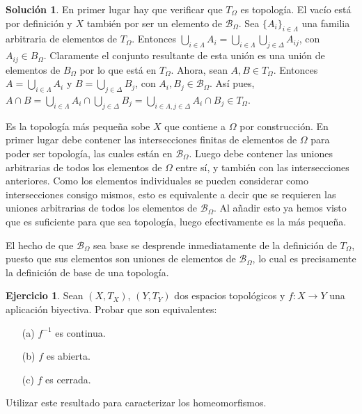 \documentclass{article}
\theoremstyle{plain}
\theoremstyle{definition}
\newtheorem{exercise}{Ejercicio}
\newtheorem*{sol*}{Solución}
\begin{document}
\begin{sol*}
En primer lugar hay que verificar que $T_\Omega$ es topología. El vacío está por definición y $X$ también por ser un elemento de $\mathcal{B}_\Omega$. Sea $\{A_i\}_{i\in\Lambda}$ una familia arbitraria de elementos de $T_\Omega$. Entonces $\bigcup_{i\in\Lambda}A_i=\bigcup_{i\in\Lambda}\bigcup_{j\in\Delta} A_{ij}$, con $A_{ij}\in B_\Omega$. Claramente el conjunto resultante de esta unión es una unión de elementos de $B_\Omega$ por lo que está en $T_\Omega$. Ahora, sean $A,B\in T_\Omega$. Entonces $A=\bigcup_{i\in\Lambda} A_i$ y $B=\bigcup_{j\in\Delta} B_j$, con $A_i,B_j\in\mathcal{B}_\Omega$. Así pues, $A\cap B=\bigcup_{i\in\Lambda} A_i\cap \bigcup_{j\in\Delta} B_j = \bigcup_{i\in\Lambda,j\in\Delta} A_i \cap B_j\in T_\Omega$.

Es la topología más pequeña sobe $X$ que contiene a $\Omega$ por construcción. En primer lugar debe contener las intersecciones finitas de elementos de $\Omega$ para poder ser topología, las cuales están en $\mathcal{B}_\Omega$. Luego debe contener las uniones arbitrarias de todos los elementos de $\Omega$ entre sí, y también con las intersecciones anteriores. Como los elementos individuales se pueden considerar como intersecciones consigo mismos, esto es equivalente a decir que se requieren las uniones arbitrarias de todos los elementos de $\mathcal{B}_\Omega$. Al añadir esto ya hemos visto que es suficiente para que sea topología, luego efectivamente es la más pequeña.

El hecho de que $\mathcal{B}_\Omega$ sea base se desprende inmediatamente de la definición de $T_\Omega$, puesto que sus elementos son uniones de elementos de $\mathcal{B}_\Omega$, lo cual es precisamente la definición de base de una topología.
\end{sol*}

\begin{exercise}
Sean $(X,T_X)$, $(Y,T_Y)$ dos espacios topológicos y $f:X\rightarrow Y$ una aplicación biyectiva. Probar que son equivalentes:
\begin{itemize}
\item[(a)] $f^{-1}$ es continua.
\item[(b)] $f$ es abierta.
\item[(c)] $f$ es cerrada.
\end{itemize}
Utilizar este resultado para caracterizar los homeomorfismos.
\end{exercise}
\end{document}
